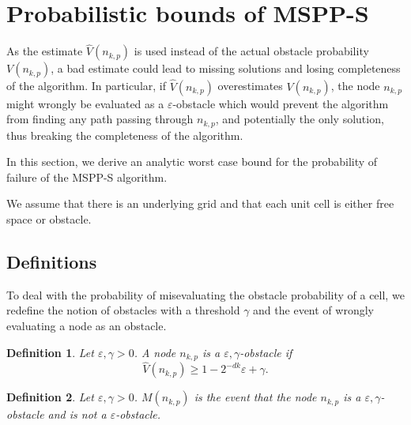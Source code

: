 \documentclass[letterpaper, 10 pt, conference]{ieeeconf}
\newtheorem{defi}{Definition}
\theoremstyle{definition}
\begin{document}
\section{Probabilistic bounds of MSPP-S}
As the estimate $\hat{V}(n_{k,p})$ is used instead of the actual obstacle probability $V(n_{k,p})$, a bad estimate could lead to missing solutions and losing completeness of the algorithm. In particular, if $\hat{V}(n_{k,p})$ overestimates $V(n_{k,p})$, the node $n_{k,p}$ might wrongly be evaluated as a $\varepsilon$-obstacle which would prevent the algorithm from finding any path passing through $n_{k,p}$, and potentially the only solution, thus breaking the completeness of the algorithm.

In this section, we derive an analytic worst case bound for the probability of failure of the MSPP-S algorithm.

We assume that there is an underlying grid and that each unit cell is either free space or obstacle.

\subsection{Definitions}
To deal with the probability of misevaluating the obstacle probability of a cell, we redefine the notion of obstacles with a threshold $\gamma$ and the event of wrongly evaluating a node as an obstacle.
\begin{defi}
Let $\varepsilon,\gamma>0$. A node $n_{k,p}$ is a $\varepsilon,\gamma$-obstacle if
\begin{equation}
\label{gobs}
\hat{V}(n_{k,p})\geq 1-2^{-d k}\varepsilon + \gamma.
\end{equation}
\end{defi}
\begin{defi}
Let $\varepsilon,\gamma>0$. $M(n_{k,p})$ is the event that the node $n_{k,p}$ is a $\varepsilon,\gamma$-obstacle and is not a $\varepsilon$-obstacle.
\end{defi}
\end{document}
